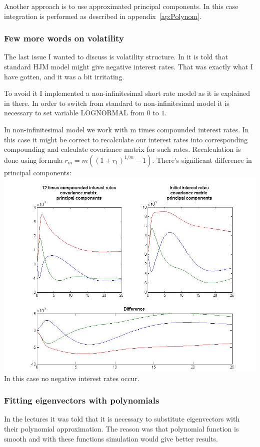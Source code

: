 \documentclass[11pt]{article} %
\begin{document}
Another approach is to use approximated principal components. In this case integration is performed as described in appendix~\ref{ap:Polynom}.

\subsubsection{Few more words on volatility}
The last issue I wanted to discuss is volatility structure. In \cite[par. 37.15]{PWoQF06} it is told that standard HJM model might give negative interest rates. That was exactly what I have gotten, and it was a bit irritating. 

To avoid it I implemented a non-infinitesimal short rate model as it is explained in there. In order to switch from standard to non-infinitesimal model it is necessary to set variable LOGNORMAL from $0$ to $1$.

In non-infinitesimal model we work with m times compounded interest rates. In this case it might be correct to recalculate our interest rates into corresponding compounding and calculate covariance matrix for such rates. Recalculation is done using formula $r_m = m\left((1+r_1)^{1/m}-1\right)$. There's significant difference in principal components:\\
\includegraphics[scale=0.4]{compounding_PCA.jpg}\\
In this case no negative interest rates occur.

\subsubsection{Fitting eigenvectors with polynomials}
In the lectures it was told that it is necessary to substitute eigenvectors with their polynomial approximation. The reason was that polynomial function is smooth and with these functions simulation would give better results.
\end{document}
